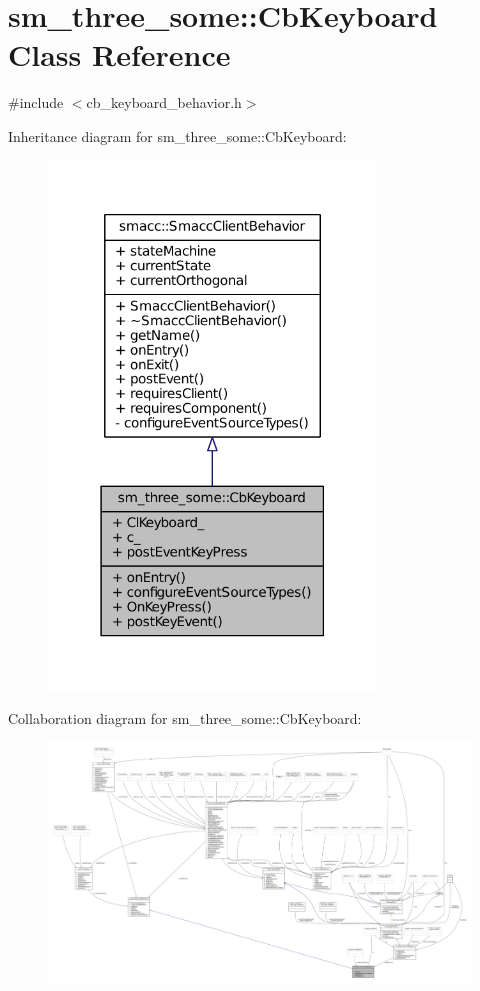 \hypertarget{classsm__three__some_1_1CbKeyboard}{}\section{sm\+\_\+three\+\_\+some\+:\+:Cb\+Keyboard Class Reference}
\label{classsm__three__some_1_1CbKeyboard}


{\ttfamily \#include $<$cb\+\_\+keyboard\+\_\+behavior.\+h$>$}



Inheritance diagram for sm\+\_\+three\+\_\+some\+:\+:Cb\+Keyboard\+:
\nopagebreak
\begin{figure}[H]
\begin{center}
\leavevmode
\includegraphics[width=247pt]{classsm__three__some_1_1CbKeyboard__inherit__graph}
\end{center}
\end{figure}


Collaboration diagram for sm\+\_\+three\+\_\+some\+:\+:Cb\+Keyboard\+:
\nopagebreak
\begin{figure}[H]
\begin{center}
\leavevmode
\includegraphics[width=350pt]{classsm__three__some_1_1CbKeyboard__coll__graph}
\end{center}
\end{figure}
